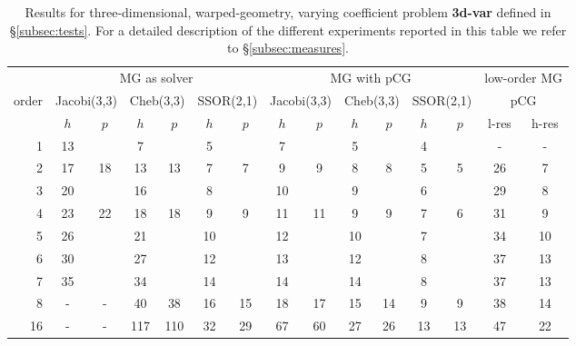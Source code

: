 \documentclass[smallcondensed,final]{svjour3}     %
\begin{document}
\begin{table}
  \caption{\label{tab:3d-fan} Results for three-dimensional,
    warped-geometry, varying coefficient problem {\bf 3d-var} defined
    in \S\ref{subsec:tests}. For a detailed description of the
    different experiments reported in this table we refer to
    \S\ref{subsec:measures}.}  \centering
	  \begin{tabular}{|r|c c|c c|c c||c c|c c|c c||c c|} 
	    \hline
	    & \multicolumn{6}{c||}{MG as solver} &
            \multicolumn{6}{c||}{MG with pCG} &
            \multicolumn{2}{r|}{\!\!low-order MG\!\!} \\
	    \cline{2-13}
	    \!\!\! order \!\!\!\! &  \multicolumn{2}{c|}{\!\!\scriptsize  Jacobi(3,3)\!\!} &  \multicolumn{2}{c|}{\!\!\scriptsize Cheb(3,3)\!\!} & \multicolumn{2}{c||}{\!\!\scriptsize  SSOR(2,1)\!\!} & \multicolumn{2}{c|}{\!\!\scriptsize Jacobi(3,3)\!\!} &  \multicolumn{2}{c|}{\!\!\scriptsize Cheb(3,3)\!\!} & \multicolumn{2}{c||}{\!\!\scriptsize SSOR(2,1)\!\!} & \multicolumn{2}{c|}{pCG}\\
	\hline
	 & $h$ & $p$ & $h$ & $p$& $h$ & $p$& $h$ & $p$& $h$ & $p$& $h$ & $p$& l-res  & h-res\\
	 \cline{2-15}
1 & 13 & & 7 & & 5 & & 7 & & 5 & & 4 & & - & - \\
2 & 17 & 18 & 13 & 13 & 7 & 7 & 9 & 9 & 8 & 8 & 5 & 5 & 26  & 7 \\
3 & 20 & & 16 & & 8 & & 10 & & 9 & & 6 & & 29  & 8 \\
4 & 23 & 22 & 18 & 18 & 9 & 9 & 11 & 11 & 9 & 9 & 7 & 6 & 31 & 9\\
5 & 26 & & 21 & & 10 & & 12 & & 10 & & 7 & & 34  & 10  \\
6 & 30 & & 27 & & 12 & & 13 & & 12 & & 8 & & 37 & 13 \\
7 & 35 & & 34 & & 14 & & 14 & & 14 & & 8 & & 37 & 13  \\
8 & - & - & 40 & 38 & 16 & 15 & 18 & 17 & 15 & 14 & 9 & 9 & 38 & 14 \\
16 & - & - & 117 & 110 & 32 & 29 & 67 & 60 & 27 & 26 & 13 & 13 & 47 & 22 \\
\hline
  \end{tabular}
\end{table}
\end{document}
